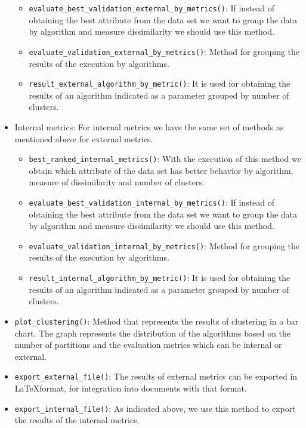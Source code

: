 \begin{itemize}
\begin{itemize}
      \item \texttt{evaluate\_best\_validation\_external\_by\_metrics()}: If instead of obtaining the best attribute from the data set we want to group the data by algorithm and measure dissimilarity we should use this method.
      \item \texttt{evaluate\_validation\_external\_by\_metrics()}: Method for grouping the results of the execution by algorithms.
      \item \texttt{result\_external\_algorithm\_by\_metric()}: It is used for obtaining the results of an algorithm indicated as a parameter grouped by number of clusters.
\end{itemize}
  \item Internal metrics: For internal metrics we have the same set of methods as mentioned above for external metrics.
  \begin{itemize}
    \item \texttt{best\_ranked\_internal\_metrics()}: With the execution of this method we obtain which attribute of the data set has better behavior by algorithm, measure of dissimilarity and number of clusters.
    \item \texttt{evaluate\_best\_validation\_internal\_by\_metrics()}: If instead of obtaining the best attribute from the data set we want to group the data by algorithm and measure dissimilarity we should use this method.
    \item \texttt{evaluate\_validation\_internal\_by\_metrics()}: Method for grouping the results of the execution by algorithms.
    \item \texttt{result\_internal\_algorithm\_by\_metric()}: It is used for obtaining the results of an algorithm indicated as a parameter grouped by number of clusters.
  \end{itemize}
    \item \texttt{plot\_clustering()}: Method that represents the results of clustering in a bar chart. The graph represents the distribution of the algorithms based on the number of partitions and the evaluation metrics which can be internal or external.
    \item \texttt{export\_external\_file()}: The results of external metrics can be exported in \LaTeX format, for integration into documents with that format.
    \item \texttt{export\_internal\_file()}: As indicated above, we use this method to export the results of the internal metrics.
\end{itemize}


